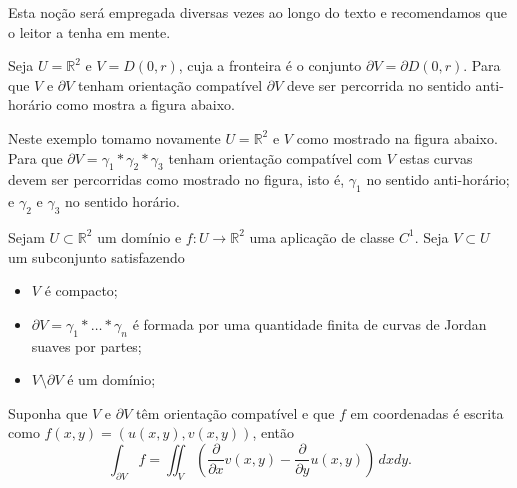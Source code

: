 Esta noção será empregada diversas vezes ao longo do texto e recomendamos que o leitor a tenha em mente.

\begin{exemplo}
Seja $U=\mathbb{R}^2$ e $V=D(0,r)$, cuja a fronteira é o conjunto $\partial V= \partial D(0,r)$. 
Para que $V$ e $\partial V$ tenham orientação compatível $\partial V$ deve ser percorrida
no sentido anti-horário como mostra a figura abaixo.
\end{exemplo}


\begin{exemplo}
Neste exemplo tomamo novamente $U=\mathbb{R}^2$ e $V$ como 
mostrado na figura abaixo. Para que $\partial V = \gamma_1*\gamma_2*\gamma_3$
tenham orientação compatível com $V$ estas curvas devem ser percorridas como 
mostrado no figura, isto é, $\gamma_1$ no sentido anti-horário; e $\gamma_2$ e $\gamma_3$
no sentido horário.
\end{exemplo}


\begin{teorema}
\label{teo-Green}
Sejam $U\subset \mathbb{R}^2$ um domínio e $f:U\to\mathbb{R}^2$ uma aplicação 
de classe $C^1$. Seja $V\subset U$ um subconjunto satisfazendo
\begin{itemize}
	\item $V$ é compacto;
	\item $\partial V = \gamma_1*\ldots*\gamma_n$ é formada por uma quantidade finita de curvas de 
	Jordan suaves por partes;
	\item $V\setminus\partial V$ é um domínio; 
\end{itemize}
Suponha que $V$ e $\partial V$ têm orientação compatível e que $f$ em coordenadas é 
escrita como $f(x,y)=(u(x,y),v(x,y))$, então 
\[
\int_{\partial V} f = \iint_{V} \left(  \frac{\partial}{\partial x}v(x,y)- \frac{\partial}{\partial y}u(x,y) \right) \, dxdy.
\]
\end{teorema}


